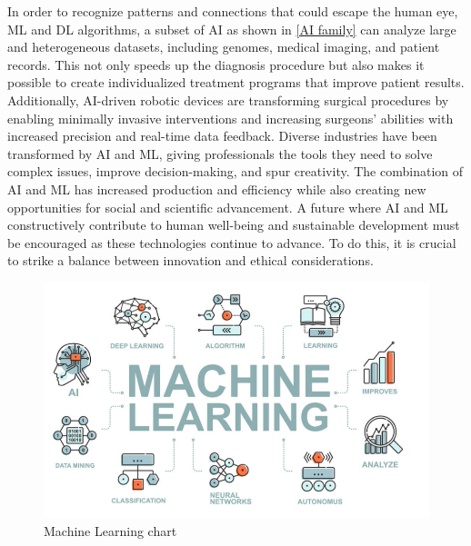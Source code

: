 \documentclass[a4paper,12pt]{report}%
\renewcommand{\\}{\vspace*{0.5\baselineskip} \newline}
\begin{document}
\noindent In order to recognize patterns and connections that could escape the human eye, ML and DL algorithms, a subset of AI as shown in \ref{AI family} can analyze large and heterogeneous datasets, including genomes, medical imaging, and patient records. This not only speeds up the diagnosis procedure but also makes it possible to create individualized treatment programs that improve patient results. Additionally, AI-driven robotic devices are transforming surgical procedures by enabling minimally invasive interventions and increasing surgeons' abilities with increased precision and real-time data feedback.
Diverse industries have been transformed by AI and ML, giving professionals the tools they need to solve complex issues, improve decision-making, and spur creativity. The combination of AI and ML has increased production and efficiency while also creating new opportunities for social and scientific advancement. A future where AI and ML constructively contribute to human well-being and sustainable development must be encouraged as these technologies continue to advance. To do this, it is crucial to strike a balance between innovation and ethical considerations.

\begin{figure}[h]
\centering
	\includegraphics[scale=0.75]{images/machine learning.png}\\
	\begin{footnotesize}
		\caption{Machine Learning chart \cite{9}}
		\label{machine learning}
	\end{footnotesize}
\end{figure}

\end{document}

